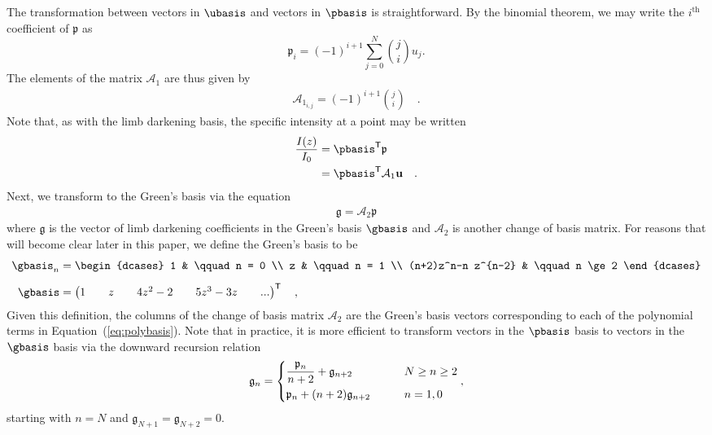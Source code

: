 \documentclass[modern,trackchanges]{aastex63}
\begin{document}
The transformation between vectors in $\ubasis$ and vectors in
$\pbasis$ is straightforward. By the binomial theorem, we may write
the $i^\mathrm{th}$ coefficient of $\mathfrak{p}$ as
%
\begin{equation}
    \label{eq:an_of_un}
    \mathfrak{p}_i = (-1)^{i+1}\sum_{j=0}^N \binom{j}{i} u_j.
\end{equation}
%
The elements of the matrix $\mathcal{A}_1$ are thus given by
%
\begin{align}
    \label{eq:A1}
    \mathcal{A}_{1_{i, j}} = (-1)^{i+1}\binom{j}{i} \quad .
\end{align}
%
Note that, as with the limb darkening basis,
the specific intensity at a point may be written
%
\begin{align}
    \label{eq:pbasis_intensity}
    \frac{I(z)}{I_0} &= \pbasis^\mathsf{T} \mathfrak{p} \nonumber \\
                     &= \pbasis^\mathsf{T} \mathcal{A}_1 \mathbf{u}  \quad .
\end{align}
%
Next, we transform to the Green's basis via the equation
%
\begin{align}
    \label{eq:gbasis}
    \mathfrak{g} = \mathcal{A}_2 \mathfrak{p}
\end{align}
%
where $\mathfrak{g}$ is the vector of limb darkening coefficients in the
Green's basis $\gbasis$ and $\mathcal{A}_2$ is another change of basis matrix.
For reasons that will become clear later in this paper,
we define the Green's basis to be
%
\begin{align}
    \gbasis_n &=
    \begin{dcases}
        1 & \qquad n = 0
        \\
        z & \qquad n = 1
        \\
        (n+2)z^n-n z^{n-2} & \qquad n \ge 2
    \end{dcases}
    \nonumber\\[0.5em]
    \gbasis &=
    \begin{pmatrix}
        1 & &
        z & &
        4z^2 - 2 &&
        5z^3 - 3z &&
        ...
    \end{pmatrix}^\mathsf{T}
    \quad,
    \label{eq:greensbasis}
\end{align}
%
Given this definition, the columns of the change of basis matrix
$\mathcal{A}_2$ are the Green's basis vectors corresponding to each
of the polynomial terms in Equation~(\ref{eq:polybasis}). Note that
in practice, it is more efficient to transform vectors in the $\pbasis$
basis to vectors in the $\gbasis$ basis via the
downward recursion relation
%
\begin{equation}
    \label{eq:dn_of_an}
    \mathfrak{g}_n = 
\begin{dcases} 
\frac{\mathfrak{p}_n}{n+2} + \mathfrak{g}_{n+2} & \qquad N \ge n \ge 2\\
\mathfrak{p}_n + (n+2) \mathfrak{g}_{n+2} & \qquad n=1,0
\end{dcases},
\end{equation}
%
starting with $n=N$ and $\mathfrak{g}_{N+1}=\mathfrak{g}_{N+2}=0$.
\end{document}
